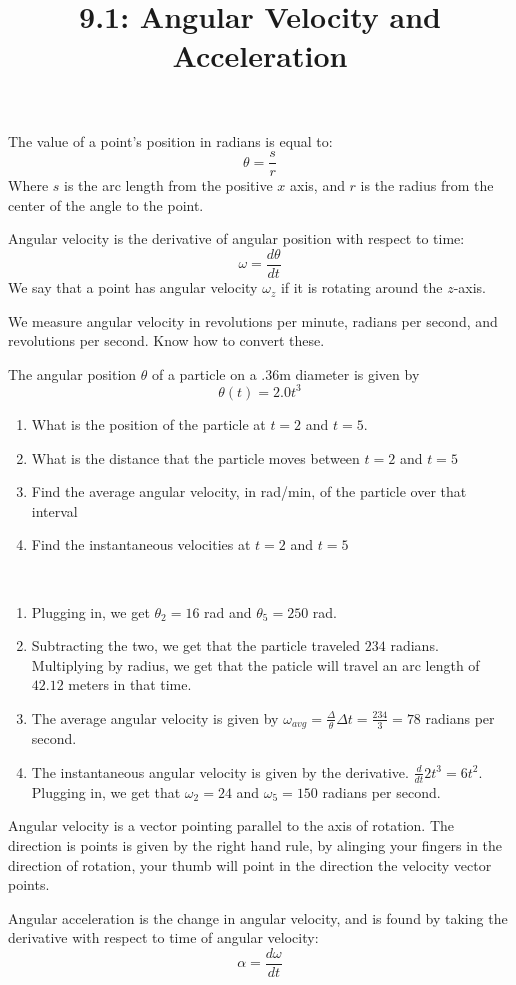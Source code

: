 \documentclass{article}
\title{9.1: Angular Velocity and Acceleration}
\begin{document}
\maketitle
The value of a point's position in radians is equal to:$$\theta = \frac{s}{r}$$Where $s$ is the arc length from the positive $x$ axis, and $r$ is the radius from the center of the angle to the point.

\begin{definition}
Angular velocity is the derivative of angular position with respect to time:$$\omega = \frac{d\theta}{dt}$$We say that a point has angular velocity $\omega_z$ if it is rotating around the $z$-axis. 

We measure angular velocity in revolutions per minute, radians per second, and revolutions per second. Know how to convert these.
\end{definition}

\begin{example}
The angular position $\theta$ of a particle on a $.36$m diameter is given by $$\theta(t) = 2.0t^3$$
\begin{enumerate}
    \item What is the position of the particle at $t=2$ and $t=5$.
    \item What is the distance that the particle moves between $t=2$ and $t=5$
    \item Find the average angular velocity, in rad/min, of the particle over that interval
    \item Find the instantaneous velocities at $t=2$ and $t=5$
\end{enumerate}
\end{example}

\begin{solution}
    \
\begin{enumerate}
    \item Plugging in, we get $\theta_2 = 16$ rad and $\theta_5 = 250$ rad.
    \item Subtracting the two, we get that the particle traveled $234$ radians. Multiplying by radius, we get that the paticle will travel an arc length of $42.12$ meters in that time.
    \item The average angular velocity is given by $\omega_{avg} = \frac{\Delta}{\theta}{\Delta t} = \frac{234}{3} = 78$ radians per second.
    \item The instantaneous angular velocity is given by the derivative. $\frac{d}{dt} 2t^3 = 6t^2$. Plugging in, we get that $\omega_2 = 24$ and $\omega_5 = 150$ radians per second.
\end{enumerate}
\end{solution}

Angular velocity is a vector pointing parallel to the axis of rotation. The direction is points is given by the right hand rule, by alinging your fingers in the direction of rotation, your thumb will point in the direction the velocity vector points.

\begin{definition}
Angular acceleration is the change in angular velocity, and is found by taking the derivative with respect to time of angular velocity: $$\alpha = \frac{d\omega}{dt}$$
\end{definition}
\end{document}
